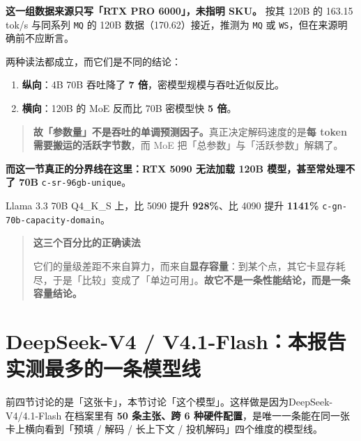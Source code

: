 \textbf{ 这一组数据来源只写「RTX PRO 6000」，未指明 SKU。} 按其 120B 的 163.15 tok/s 与同系列 \texttt{MQ} 的 120B 数据（170.62）接近，推测为 \texttt{MQ} 或 \texttt{WS}，但在来源明确前不应断言。


两种读法都成立，而它们是不同的结论：


\begin{enumerate}
  \item \textbf{纵向}：4B  70B 吞吐降了 \textbf{7 倍}，密模型规模与吞吐近似反比。
  \item \textbf{横向}：120B 的 MoE 反而比 70B 密模型快 \textbf{5 倍}。
\end{enumerate}

\begin{quote}\small
\textbf{ 故「参数量」不是吞吐的单调预测因子。}真正决定解码速度的是\textbf{每 token 需要搬运的活跃字节数}，而 MoE 把「总参数」与「活跃参数」解耦了。

\end{quote}

\textbf{而这一节真正的分界线在这里：RTX 5090 无法加载 120B 模型，甚至常处理不了 70B} {\scriptsize\texttt{c-\hspace{0pt}sr-\hspace{0pt}96gb-\hspace{0pt}unique}}。


Llama 3.3 70B Q4\_K\_S 上，比 5090 提升 \textbf{928\%}、比 4090 提升 \textbf{1141\%} {\scriptsize\texttt{c-\hspace{0pt}gn-\hspace{0pt}70b-\hspace{0pt}capacity-\hspace{0pt}domain}}。


\begin{quote}\small
\textbf{ 这三个百分比的正确读法}

它们的量级差距不来自算力，而来自\textbf{显存容量}：到某个点，其它卡显存耗尽，于是「比较」变成了「单边可用」。\textbf{故它不是一条性能结论，而是一条容量结论。}

\end{quote}


\section{DeepSeek-V4 / V4.1-Flash：本报告实测最多的一条模型线}

前四节讨论的是「这张卡」，本节讨论「这个模型」。这样做是因为DeepSeek-V4/4.1-Flash 在档案里有 \textbf{50 条主张、跨 6 种硬件配置}，是唯一一条能在同一张卡上横向看到「预填 / 解码 / 长上下文 / 投机解码」四个维度的模型线。


